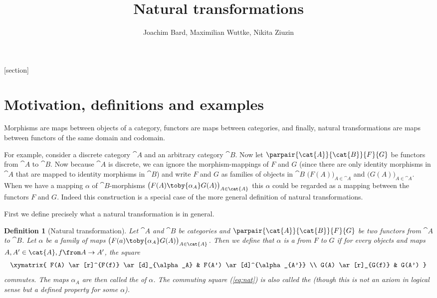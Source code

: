 \def\pathToRoot{../../}

\usepackage{todonotes}

\newcommand{\catA}[0]{\cat{A}}
\newcommand{\catB}[0]{\cat{B}}

[section]
\newtheorem{defn}[counter]{Definition}
\newtheorem{exmp}[counter]{Example}
\newtheorem{lemma}[counter]{Lemma}


\title{Natural transformations}
\author{Joachim Bard, Maximilian Wuttke, Nikita Ziuzin}



\maketitle


\section*{Motivation, definitions and examples}
Morphisms are maps between objects of a category, functors are maps between categories, and finally, natural transformations are maps between functors of the same domain and codomain.

For example, consider a discrete category $\catA$ and an arbitrary category $\catB$.
Now let $\parpair{\catA}{\catB}{F}{G}$ be functors from $\catA$ to $\catB$.
Now because $\catA$ is discrete, we can ignore the morphism-mappings of $F$ and $G$ (since there are only identity morphisms in $\catA$ that are mapped to identity morphisms in $\catB$) and write $F$ and $G$ as families
of objects in $\catB$
$\bigl(F(A)\bigr)_{A\in\catA}$ and $\bigl(G(A)\bigr)_{A\in\catA}$.
When we have a mapping $\alpha$ of $\catB$-morphisms
$\bigl(F(A)\toby{\alpha_A}G(A)\bigr)_{A\in\catA}$
this $\alpha$ could be regarded as a mapping between the functors $F$ and $G$.
Indeed this construction is a special case of the more general definition of natural transformations.

First we define precisely what a natural transformation is in general.
\begin{defn}[Natural transformation]
  \label{def:nat}
  Let $\catA$ and $\catB$ be categories and $\parpair{\catA}{\catB}{F}{G}$ be two functors from $\catA$ to $\catB$.
  Let $\alpha$ be a family of maps
  $\bigl(F(a)\toby{\alpha_A}G(A)\bigr)_{A\in\catA}$.
  Then we define that $\alpha$ is a  from $F$ to $G$ if
  for every objects and maps $A, A' \in \catA, f \from A \to A'$, the square
  \begin{equation}
    \label{eq:nat}
    \begin{array}{c}
      \xymatrix{
        F(A) \ar[r]^{F(f)} \ar[d]_{\alpha_A} & F(A') \ar[d]^{\alpha_{A'}} \\
        G(A) \ar[r]_{G(f)} & G(A')
      }
    \end{array}
  \end{equation}
  commutes.
  The maps $\alpha_A$ are then called the  of $\alpha$.
  The commuting square (\ref{eq:nat}) is also called the  (though this is not an axiom in logical sense but a defined property for some $\alpha$).
\end{defn}

